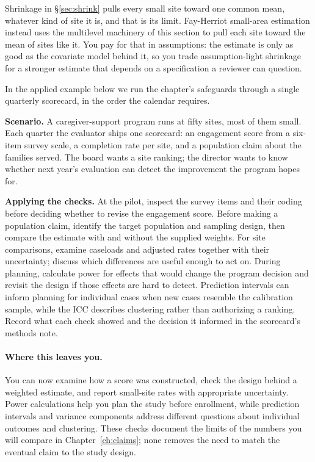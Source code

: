 \documentclass[
    a4paper,
    fontsize=10pt,
    twoside=true,
    numbers=noenddot,
]{kaobook}
\newcounter{appliedexample}
\newenvironment{appliedexample}[1][]{%
    \refstepcounter{appliedexample}%
    \begin{appliedexamplebox}[frametitle={Applied Example~\theappliedexample.~~#1}]%
}{%
    \end{appliedexamplebox}%
}
\begin{document}
Shrinkage in \S\ref{sec:shrink} pulls every small site toward one common mean, whatever kind of site it is, and that is its limit. Fay-Herriot small-area estimation \parencite{fay1979estimates,rao2015small} instead uses the multilevel machinery of this section to pull each site toward the mean of sites like it. You pay for that in assumptions: the estimate is only as good as the covariate model behind it, so you trade assumption-light shrinkage for a stronger estimate that depends on a specification a reviewer can question.

In the applied example below we run the chapter's safeguards through a single quarterly scorecard, in the order the calendar requires.

\begin{appliedexample}[One quarterly scorecard, four safeguards]\label{ae:ch07-scorecard}
\textbf{Scenario.} A caregiver-support program runs at fifty sites, most of them small. Each quarter the evaluator ships one scorecard: an engagement score from a six-item survey scale, a completion rate per site, and a population claim about the families served. The board wants a site ranking; the director wants to know whether next year's evaluation can detect the improvement the program hopes for.

\medskip
\textbf{Applying the checks.} At the pilot, inspect the survey items and their coding before deciding whether to revise the engagement score. Before making a population claim, identify the target population and sampling design, then compare the estimate with and without the supplied weights. For site comparisons, examine caseloads and adjusted rates together with their uncertainty; discuss which differences are useful enough to act on. During planning, calculate power for effects that would change the program decision and revisit the design if those effects are hard to detect. Prediction intervals can inform planning for individual cases when new cases resemble the calibration sample, while the ICC describes clustering rather than authorizing a ranking. Record what each check showed and the decision it informed in the scorecard's methods note.
\end{appliedexample}

\paragraph{Where this leaves you.} You can now examine how a score was constructed, check the design behind a weighted estimate, and report small-site rates with appropriate uncertainty. Power calculations help you plan the study before enrollment, while prediction intervals and variance components address different questions about individual outcomes and clustering. These checks document the limits of the numbers you will compare in Chapter~\ref{ch:claims}; none removes the need to match the eventual claim to the study design.
\end{document}
